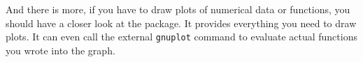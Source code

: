 \pagebreak
And there is more, if you have to draw plots of numerical data or
functions, you should have a closer look at the  
package. It provides everything you need to draw plots. It can even
call the external \texttt{gnuplot} command to evaluate actual
functions you wrote into the graph.

